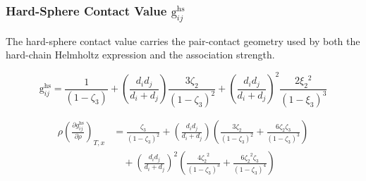 \documentclass[12pt, letterpaper]{article}
\begin{document}
\subsubsection{Hard-Sphere Contact Value \texorpdfstring{\(\mathrm{g}_{ij}^{\mathrm{hs}}\)}{g_hs}}

The hard-sphere contact value carries the pair-contact geometry used by both the hard-chain Helmholtz expression and the association strength.

\begin{equation}
    \mathrm{g}_{i j}^{\mathrm{hs}}=\frac{1}{\left(1-\zeta_{3}\right)}+\left(\frac{d_{i} d_{j}}{d_{i}+d_{j}}\right) \frac{3 \zeta_{2}}{\left(1-\zeta_{3}\right)^2} + \left(\frac{d_{i} d_{j}}{d_{i}+d_{j}}\right)^2 \frac{2 \xi_{2}{ }^2}{\left(1-\xi_{3}\right)^3}
    \label{eq:g_hs_contact}
\end{equation}


\begin{equation}
    \begin{aligned}
        \rho\left(\frac{\partial g_{ij}^{\mathrm{hs}}}{\partial\rho}\right)_{T,x}
        &=
        \frac{\zeta_{3}}{\left(1-\zeta_{3}\right)^{2}}
        +
        \left(\frac{d_{i}d_{j}}{d_{i}+d_{j}}\right)
        \left(
            \frac{3\zeta_{2}}{\left(1-\zeta_{3}\right)^{2}}
            +
            \frac{6\zeta_{2}\zeta_{3}}{\left(1-\zeta_{3}\right)^{3}}
        \right)
        \\
        &\quad +
        \left(\frac{d_{i}d_{j}}{d_{i}+d_{j}}\right)^{2}
        \left(
            \frac{4{\zeta_{2}}^{2}}{\left(1-{\zeta_{3}}\right)^{3}}
            +
            \frac{6{\zeta_{2}}^{2}\zeta_{3}}{\left(1-{\zeta_{3}}\right)^{4}}
        \right)
    \end{aligned}
    \label{eq:ghs_contact_dadrho}
\end{equation}

\end{document}
